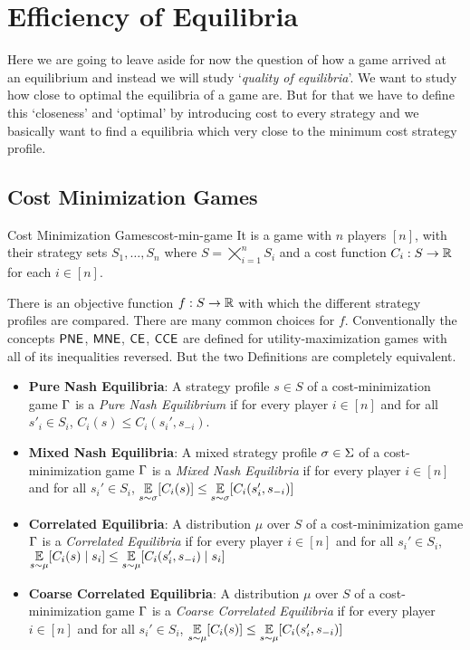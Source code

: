 \chapter{Efficiency of Equilibria}
Here we are going to leave aside for now the question of how a game arrived at an equilibrium and instead we will study `\textit{quality of equilibria}'. We want to study how close to optimal the equilibria of a game are. But for that we have to define this `closeness' and `optimal'  by introducing cost to every strategy and we basically want to find a equilibria which very close to the minimum cost strategy profile.
\section{Cost Minimization Games}
\begin{Definition}{Cost Minimization Games}{cost-min-game}
	It is a game with $n$ players $[n]$, with their strategy sets $S_1,\dots, S_n$  where $S=\bigtimes\limits_{i=1}^n S_i$ and a cost function $C_i:S\to \mathbb{R}$ for each $i\in[n]$. 
\end{Definition}
 
There is an objective function $f:S\to \mathbb{R}$ with which the different strategy profiles are compared. There are many common choices for $f$. Conventionally the concepts $\operatorname{\mathsf{PNE}}$, $\operatorname{\mathsf{MNE}}$, $\operatorname{\mathsf{CE}}$, $\operatorname{\mathsf{CCE}}$ are defined for utility-maximization games with all of its inequalities reversed. But the two Definitions are completely equivalent.\begin{itemize}
	\item \textbf{Pure Nash Equilibria}: A strategy profile $s\in S$ of a cost-minimization game $\Gamma$ is a \textit{Pure Nash Equilibrium} if for every player $i\in[n]$ and for all $s'_i\in S_i$, $C_i(s)\leq C_i(s_i',s_{-i})$.
	\item \textbf{Mixed Nash Equilibria}: A mixed strategy profile $\sigma\in \Sigma$ of a cost-minimization game $\Gamma$ is a \textit{Mixed Nash Equilibria} if for every player $i\in[n]$ and for all $s_i'\in S_i$, $\underset{s\sim \sigma}{\mathbb{E}}[C_i(s)]\leq \underset{s\sim \sigma}{\mathbb{E}}[C_i(s_i',s_{-i})]$
	\item \textbf{Correlated Equilibria}: A distribution $\mu$ over $S$ of a cost-minimization game $\Gamma$ is a \textit{Correlated Equilibria} if for every player $i\in[n]$ and for all $s_i'\in S_i$, $\underset{s\sim \mu}{\mathbb{E}}[C_i(s)\mid s_i]\leq \underset{s\sim \mu}{\mathbb{E}}[C_i(s_i',s_{-i})\mid s_i]$
	\item \textbf{Coarse Correlated Equilibria}: A distribution $\mu$ over $S$ of a cost-minimization game $\Gamma$ is a \textit{Coarse Correlated Equilibria} if for every player $i\in[n]$ and for all $s_i'\in S_i$, $\underset{s\sim \mu}{\mathbb{E}}[C_i(s)]\leq \underset{s\sim \mu}{\mathbb{E}}[C_i(s_i',s_{-i})]$
\end{itemize}

